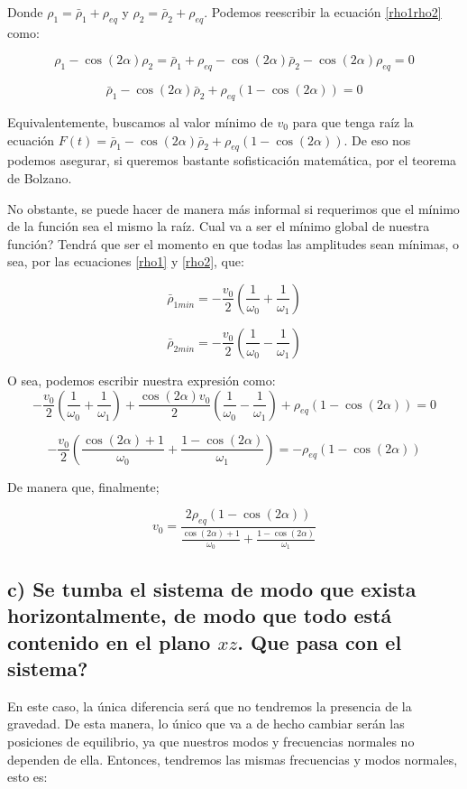 \documentclass[a4paper,12pt]{article}
\begin{document}
Donde $\rho_{1} = \bar{\rho}_1 + \rho_{eq} $ y $\rho_{2} = \bar{\rho}_2 + \rho_{eq} $. Podemos reescribir la ecuación \eqref{rho1rho2} como:

$$\rho_{1} - \cos(2\alpha)\rho_{2} = \bar{\rho}_1 + \rho_{eq} - \cos(2\alpha) \bar{\rho}_2 - \cos(2\alpha)\rho_{eq} = 0$$

$$\bar{\rho}_{1} - \cos(2\alpha)\bar{\rho}_2 + \rho_{eq}(1-\cos(2\alpha)) = 0$$

Equivalentemente, buscamos al valor mínimo de $v_{0}$ para que tenga raíz la ecuación $F(t) =\bar{\rho}_{1} - \cos(2\alpha)\bar{\rho}_2 + \rho_{eq}(1-\cos(2\alpha))$. De eso nos podemos asegurar, si queremos bastante sofisticación matemática, por el teorema de Bolzano. 

No obstante, se puede hacer de manera más informal si requerimos que el mínimo de la función sea el mismo la raíz. Cual va a ser el mínimo global de nuestra función? Tendrá que ser el momento en que todas las amplitudes sean mínimas, o sea, por las ecuaciones \eqref{rho1} y \eqref{rho2}, que:

$$\bar{\rho}_{1min} = -\frac{v_0}{2}\left( \frac{1}{\omega_0} + \frac{1}{\omega_1}\right)$$

$$\bar{\rho}_{2min} = -\frac{v_0}{2}\left( \frac{1}{\omega_0} - \frac{1}{\omega_1}\right)$$

O sea, podemos escribir nuestra expresión como:
$$-\frac{v_0}{2}\left( \frac{1}{\omega_0} + \frac{1}{\omega_1}\right) +\frac{\cos(2\alpha)v_0}{2}\left( \frac{1}{\omega_0} - \frac{1}{\omega_1}\right) + \rho_{eq}(1-\cos(2\alpha)) = 0$$

$$-\frac{v_0}{2}\left(\frac{\cos(2\alpha)+1}{\omega_0} + \frac{1-\cos(2\alpha)}{\omega_1} \right) = -\rho_{eq}(1-\cos(2\alpha)) $$

De manera que, finalmente;

\begin{equation}
  v_0 =\frac{2\rho_{eq}(1-\cos(2\alpha))}{\frac{\cos(2\alpha)+1}{\omega_0} + \frac{1-\cos(2\alpha)}{\omega_1}}
\end{equation}


\subsection*{c) Se tumba el sistema de modo que exista horizontalmente, de modo que todo está contenido en el plano $xz$. Que pasa con el sistema?}

En este caso, la única diferencia será que no tendremos la presencia de la gravedad. De esta manera, lo único que va a de hecho cambiar serán las posiciones de equilibrio, ya que nuestros modos y frecuencias normales no dependen de ella. Entonces, tendremos las mismas frecuencias y modos normales, esto es:
\end{document}
